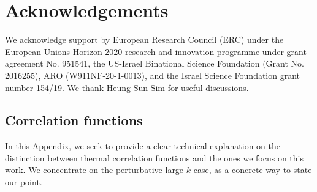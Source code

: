 \documentclass[aps,prb,twocolumn,superscriptaddress]{revtex4-1}
\begin{document}
\section{Acknowledgements} We acknowledge support by European  Research Council (ERC) under the European Unions Horizon 2020 research and innovation programme under grant agreement No. 951541, the US-Israel Binational
Science Foundation (Grant No. 2016255),  ARO (W911NF-20-1-0013), and the Israel Science Foundation grant number 154/19. We thank Heung-Sun Sim for useful discussions.

 

\appendix

\begin{widetext}
\section{Correlation functions} \label{app:correlations}
In this Appendix, we seek to provide a clear technical explanation on the distinction between thermal correlation functions and the ones we focus on this work. We concentrate on the perturbative large-$k$ case, as a concrete way to state our point. 


\end{widetext}
\end{document}
